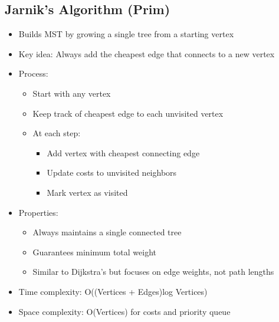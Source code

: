 \documentclass[11pt,a4paper]{article}
\begin{document}
\begin{multicols}{2}
\subsection{Jarnik's Algorithm (Prim)}
\begin{itemize}
    \item Builds MST by growing a single tree from a starting vertex
    \item Key idea: Always add the cheapest edge that connects to a new vertex
    \item Process:
    \begin{itemize}
        \item Start with any vertex
        \item Keep track of cheapest edge to each unvisited vertex
        \item At each step:
        \begin{itemize}
            \item Add vertex with cheapest connecting edge
            \item Update costs to unvisited neighbors
            \item Mark vertex as visited
        \end{itemize}
    \end{itemize}
    \item Properties:
    \begin{itemize}
        \item Always maintains a single connected tree
        \item Guarantees minimum total weight
        \item Similar to Dijkstra's but focuses on edge weights, not path lengths
    \end{itemize}
    \item Time complexity: O((Vertices + Edges)log Vertices)
    \item Space complexity: O(Vertices) for costs and priority queue
\end{itemize}


\end{multicols}
\end{document}
